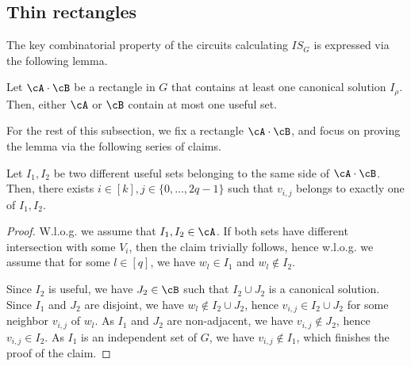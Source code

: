 \subsection{Thin rectangles}

The key combinatorial property of the circuits calculating $IS_G$ is expressed via the following lemma.
\begin{lemma}\label{lem:is_thin_rects}
	Let $\cA \cdot \cB$ be a rectangle in $G$ that contains at least one canonical solution $I_\rho$. Then, either $\cA$ or $\cB$ contain at most one useful set.
\end{lemma}

For the rest of this subsection, we fix a rectangle $\cA \cdot \cB$, and focus on proving the lemma via the following series of claims.
\begin{claim}
    Let $I_1, I_2$ be two different useful sets belonging to the same side of $\cA \cdot \cB$. Then, there exists $i \in [k], j \in \{0, \dots, 2q - 1\}$ such that $v_{i, j}$ belongs to exactly one of $I_1, I_2$.
\end{claim}
\begin{proof}
    W.l.o.g. we assume that $I_1, I_2 \in \cA$. If both sets have different intersection with some $V_i$, then the claim trivially follows, hence w.l.o.g. we assume that for some $l \in [q]$, we have $w_l \in I_1$ and $w_l \not\in I_2$.
    
    Since $I_2$ is useful, we have $J_2 \in \cB$ such that $I_2 \cup J_2$ is a canonical solution. Since $I_1$ and $J_2$ are disjoint, we have $w_l \not\in I_2 \cup J_2$, hence $v_{i,j} \in I_2 \cup J_2$ for some neighbor $v_{i, j}$ of $w_l$. As $I_1$ and $J_2$ are non-adjacent, we have $v_{i,j} \not\in J_2$, hence $v_{i,j} \in I_2$. As $I_1$ is an independent set of $G$, we have $v_{i,j} \not\in I_1$, which finishes the proof of the claim.
\end{proof}

